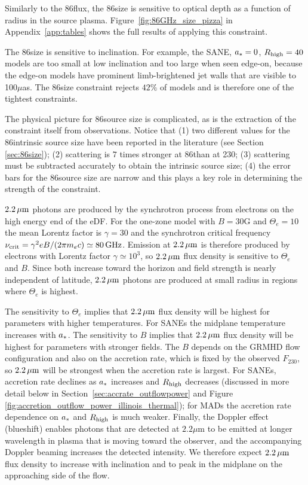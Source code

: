 Similarly to the 86\GHz flux, the 86\GHz size is sensitive to optical depth as a function of radius in the source plasma.
Figure~\ref{fig:86GHz_size_pizza} in Appendix~\ref{app:tables} shows the full results of applying this constraint.

The 86\GHz size is sensitive to inclination.
For example, the SANE, $a_* = 0$, $R_\mathrm{high} = 40$ models are too small at low inclination and too large when seen edge-on, because the edge-on models have prominent limb-brightened jet walls that are visible to 100$\mu$as.
The 86\GHz size constraint rejects
$42\%$ of models and is therefore one of the tightest constraints.

The physical picture for 86\GHz source size is complicated, as is the extraction of the constraint itself from observations.
Notice that (1) two different values for the 86\GHz intrinsic source size have been reported in the literature (see Section \ref{sec:86size}); (2) scattering is $7$ times stronger at 86\GHz than at 230\GHz; (3) scattering must be subtracted accurately to obtain the intrinsic source size; (4) the error bars for the 86\GHz source size are narrow and this plays a key role in determining the strength of the constraint.


$2.2\,\mu\mathrm{m}$ photons are produced by the synchrotron process from electrons on the high energy end of the eDF.
For the one-zone model with $B = 30$G and $\Theta_e = 10$ the mean Lorentz factor is $\gamma = 30$ and the synchrotron critical frequency $\nu_\mathrm{crit} = \gamma^2 e B/(2 \pi m_e c) \simeq 80\,\mathrm{GHz}$.
Emission at $2.2\,\mu\mathrm{m}$ is therefore produced by electrons with  Lorentz factor $\gamma \simeq 10^3$, so $2.2\,\mu\mathrm{m}$ flux density is sensitive to $\Theta_e$ and $B$.
Since both increase toward the horizon and field strength is nearly independent of latitude, $2.2\,\mu\mathrm{m}$ photons are produced at small radius in regions where $\Theta_e$ is highest.

The sensitivity to $\Theta_e$ implies that $2.2\,\mu\mathrm{m}$ flux density will be highest for parameters with higher temperatures.
For SANEs the midplane temperature increases with $a_*$.
The sensitivity to $B$ implies that $2.2\,\mu\mathrm{m}$ flux density will be highest for parameters with stronger fields.
The $B$ depends on the GRMHD flow configuration and also on the accretion rate, which is fixed by the observed $F_{230}$, so $2.2\,\mu\mathrm{m}$ will be strongest when the accretion rate is largest.
For SANEs, accretion rate declines as $a_*$ increases and $R_\mathrm{high}$ decreases (discussed in more detail below in  Section~\ref{sec:accrate_outflowpower} and Figure \ref{fig:accretion_outflow_power_illinois_thermal}); for MADs the accretion rate dependence on $a_*$ and $R_\mathrm{high}$ is much weaker.
Finally, the Doppler effect (blueshift) enables photons that are detected at $2.2\mu$m to be emitted at longer wavelength in plasma that is moving toward the observer, and the accompanying Doppler beaming increases the detected intensity.
We therefore expect $2.2\,\mu\mathrm{m}$ flux density to increase with inclination and to peak in the midplane on the approaching side of the flow.

